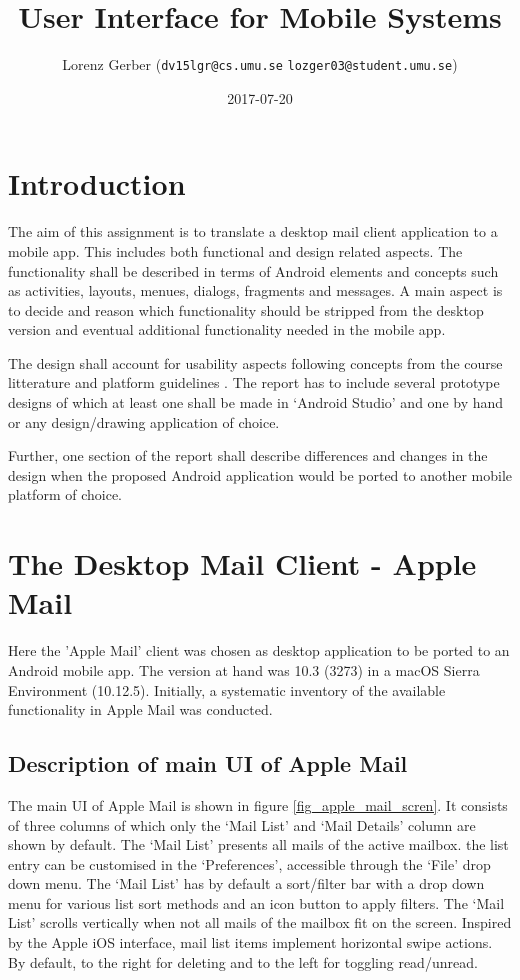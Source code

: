 \documentclass[a4paper,11pt,twoside]{article}
\title{User Interface for Mobile Systems}
\author{Lorenz Gerber ({\tt{dv15lgr@cs.umu.se}} {\tt{lozger03@student.umu.se}})}
\date{2017-07-20}
\begin{document}
\lstset{language=C}
\maketitle
\thispagestyle{empty}
\newpage
\tableofcontents
\thispagestyle{empty}
\newpage

\clearpage
{}

\section{Introduction}
The aim of this assignment is to translate a desktop mail client application to
a mobile app. This includes both functional and design related aspects. The
functionality shall be described in terms of Android elements and concepts such
as activities, layouts, menues, dialogs, fragments and messages. A main aspect is
to decide and reason which functionality should be stripped from the desktop version
and eventual additional functionality needed in the mobile app.

The design shall account for usability aspects following concepts from the
course litterature \cite{clark2015} and platform guidelines \cite{materialdesign}.
The report has to include several prototype designs of which at least one shall be
made in `Android Studio' and one by hand or any design/drawing application of choice.

Further, one section of the report shall describe differences and changes in the
design when the proposed Android application would be ported to another mobile
platform of choice.

\section{The Desktop Mail Client - Apple Mail}
Here the 'Apple Mail' client was chosen as desktop application to be ported to
an Android mobile app. The version at hand was 10.3 (3273) in a macOS Sierra
Environment (10.12.5). Initially, a systematic inventory of the available
functionality in Apple Mail was conducted.

\subsection{Description of main UI of Apple Mail}
The main UI of Apple Mail is shown in figure \ref{fig_apple_mail_scren}.
It consists of three columns of which only the `Mail List' and `Mail Details'
column are shown by default. The `Mail List' presents all mails of the active mailbox.
the list entry can be customised in the `Preferences', accessible through the `File'
drop down menu. The `Mail List' has by default a sort/filter bar with a drop down
menu for various list sort methods and an icon button to apply filters. The `Mail
List' scrolls vertically when not all mails of the mailbox fit on the screen.
Inspired by the Apple iOS interface, mail list items implement horizontal swipe
actions. By default, to the right for deleting and to the left for toggling
read/unread.
\end{document}
